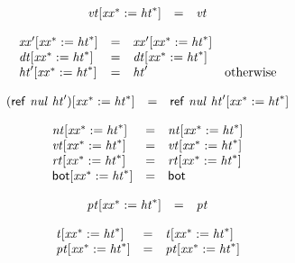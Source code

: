 $$
\begin{array}{@{}lcl@{}l@{}}
{{\mathit{vt}}}{{}[{{\mathit{xx}}^\ast} := {{\mathit{ht}}^\ast}]} &=& {\mathit{vt}} &  \\
\end{array}
$$

$$
\begin{array}{@{}lcl@{}l@{}}
{{\mathit{xx}'}}{{}[{{\mathit{xx}}^\ast} := {{\mathit{ht}}^\ast}]} &=& {{\mathit{xx}'}}{{}[{{\mathit{xx}}^\ast} := {{\mathit{ht}}^\ast}]} &  \\
{{\mathit{dt}}}{{}[{{\mathit{xx}}^\ast} := {{\mathit{ht}}^\ast}]} &=& {{\mathit{dt}}}{{}[{{\mathit{xx}}^\ast} := {{\mathit{ht}}^\ast}]} &  \\
{{\mathit{ht}'}}{{}[{{\mathit{xx}}^\ast} := {{\mathit{ht}}^\ast}]} &=& {\mathit{ht}'} &\quad
  \mbox{otherwise} \\
\end{array}
$$

$$
\begin{array}{@{}lcl@{}l@{}}
{(\mathsf{ref}~{\mathit{nul}}~{\mathit{ht}'})}{{}[{{\mathit{xx}}^\ast} := {{\mathit{ht}}^\ast}]} &=& \mathsf{ref}~{\mathit{nul}}~{{\mathit{ht}'}}{{}[{{\mathit{xx}}^\ast} := {{\mathit{ht}}^\ast}]} &  \\
\end{array}
$$

$$
\begin{array}{@{}lcl@{}l@{}}
{{\mathit{nt}}}{{}[{{\mathit{xx}}^\ast} := {{\mathit{ht}}^\ast}]} &=& {{\mathit{nt}}}{{}[{{\mathit{xx}}^\ast} := {{\mathit{ht}}^\ast}]} &  \\
{{\mathit{vt}}}{{}[{{\mathit{xx}}^\ast} := {{\mathit{ht}}^\ast}]} &=& {{\mathit{vt}}}{{}[{{\mathit{xx}}^\ast} := {{\mathit{ht}}^\ast}]} &  \\
{{\mathit{rt}}}{{}[{{\mathit{xx}}^\ast} := {{\mathit{ht}}^\ast}]} &=& {{\mathit{rt}}}{{}[{{\mathit{xx}}^\ast} := {{\mathit{ht}}^\ast}]} &  \\
{\mathsf{bot}}{{}[{{\mathit{xx}}^\ast} := {{\mathit{ht}}^\ast}]} &=& \mathsf{bot} &  \\
\end{array}
$$

$$
\begin{array}{@{}lcl@{}l@{}}
{{\mathit{pt}}}{{}[{{\mathit{xx}}^\ast} := {{\mathit{ht}}^\ast}]} &=& {\mathit{pt}} &  \\
\end{array}
$$

$$
\begin{array}{@{}lcl@{}l@{}}
{{\mathit{t}}}{{}[{{\mathit{xx}}^\ast} := {{\mathit{ht}}^\ast}]} &=& {{\mathit{t}}}{{}[{{\mathit{xx}}^\ast} := {{\mathit{ht}}^\ast}]} &  \\
{{\mathit{pt}}}{{}[{{\mathit{xx}}^\ast} := {{\mathit{ht}}^\ast}]} &=& {{\mathit{pt}}}{{}[{{\mathit{xx}}^\ast} := {{\mathit{ht}}^\ast}]} &  \\
\end{array}
$$

